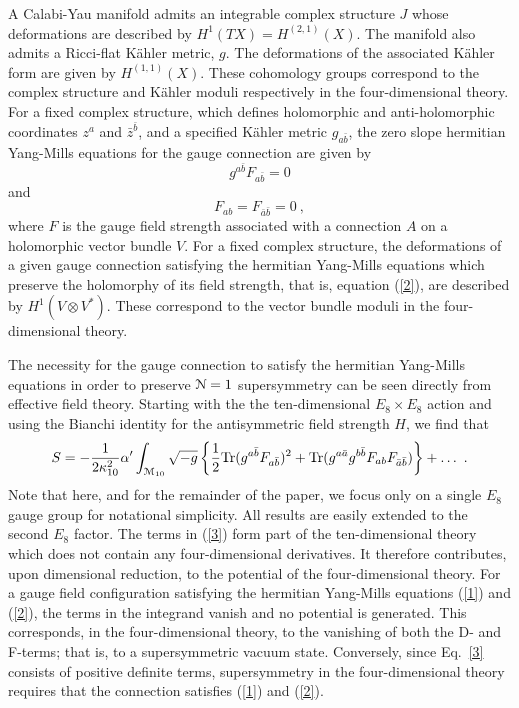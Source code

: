\documentclass[12pt]{article}
\numberwithin{equation}{section}
\begin{document}
A Calabi-Yau manifold admits an integrable complex structure $J$ whose deformations are described by $H^{1}(TX)=H^{(2,1)}(X)$. The manifold also admits a Ricci-flat K\"ahler metric, $g$. The deformations of the associated K\"ahler form are given by $H^{(1,1)}(X)$. These cohomology groups correspond to the complex structure and K\"ahler moduli respectively in the four-dimensional theory. For a fixed complex structure, which defines holomorphic and anti-holomorphic coordinates $z^{a}$ and ${\bar{z}}^{{\bar{b}}}$, and a specified K\"ahler metric $g_{a{\bar{b}}}$, the zero slope hermitian Yang-Mills equations \cite{Green:1987mn} for the gauge connection are given by 
%
\begin{equation}
\label{1}
g^{a{\bar{b}}} F_{a{\bar{b}}} =0 
\end{equation}
%
and
%
\begin{equation}
F_{ab} =F_{{\bar{a}}{\bar{b}}}=0 \ ,
 \label{2}
\end{equation}
%
where $F$ is the gauge field strength associated with a connection $A$ on a holomorphic vector bundle $V$. For a fixed complex structure, the deformations of a given gauge connection satisfying the hermitian Yang-Mills equations which preserve the holomorphy of its field strength, that is, equation (\ref{2}), are described by $H^{1}(V \otimes V^{*})$. These correspond to the vector bundle moduli in the four-dimensional theory.

The necessity for the gauge connection to satisfy the hermitian Yang-Mills equations in order to 
preserve ${\cal{N}}=1$ supersymmetry can be seen directly from effective field theory. Starting with the the ten-dimensional $E_{8} \times E_{8}$ action and using the Bianchi identity
for the antisymmetric field strength $H$, we find that
%
\begin{equation}
S = - \frac{1}{2\kappa_{10}^{2}} \alpha' \int_{{\cal{M}}_{10}}\sqrt{-g} \left\{\frac{1}{2} \textnormal{Tr}(g^{a{\bar{b}}} F_{a{\bar{b}}})^{2}+\textnormal{Tr}(g^{a{\bar{a}}} g^{b{\bar{b}}} F_{ab}F_{{\bar{a}}{\bar{b}}}) \right\}+\dots \ .
\label{3}
\end{equation}
\noindent Note that here, and for the remainder of the paper, we focus
only on a single $E_{8}$ gauge group for notational simplicity. All
results are easily extended to the second $E_{8}$ factor.  The terms
in (\ref{3}) form part of the ten-dimensional theory which does not
contain any four-dimensional derivatives. It therefore contributes,
upon dimensional reduction, to the potential of the four-dimensional
theory. For a gauge field configuration satisfying the hermitian
Yang-Mills equations (\ref{1}) and (\ref{2}), the terms in the
integrand vanish and no potential is generated. This corresponds, in
the four-dimensional theory, to the vanishing of both the D- and
F-terms; that is, to a supersymmetric vacuum state. Conversely,
since Eq.~\eqref{3} consists of positive definite terms,
supersymmetry in the four-dimensional theory requires that the
connection satisfies (\ref{1}) and (\ref{2}).
 
\end{document}
